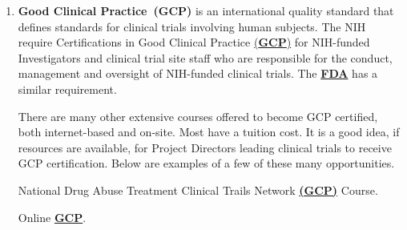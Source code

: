 \documentclass[]{book}
\theoremstyle{definition}
\theoremstyle{definition}
\theoremstyle{definition}
\theoremstyle{remark}
\begin{document}
\begin{enumerate}
\def\labelenumi{\arabic{enumi}.}
\item
  \textbf{Good Clinical Practice~(GCP)} is an international quality
  standard that defines standards for clinical trials involving human
  subjects. The NIH require Certifications in Good Clinical Practice
  \href{https://grants.nih.gov/grants/guide/notice-files/NOT-OD-16-148.html\#_ftn2_}{(\textbf{GCP})}
  for NIH-funded Investigators and clinical trial site staff who are
  responsible for the conduct, management and oversight of NIH-funded
  clinical trials. The
  \href{https://gcplearningcenter.niaid.nih.gov/Pages/default.aspx}{\textbf{FDA}}
  has a similar requirement.

  There are many other extensive courses offered to become GCP
  certified, both internet-based and on-site. Most have a tuition cost.
  It is a good idea, if resources are available, for Project Directors
  leading clinical trials to receive GCP certification. Below are
  examples of a few of these many opportunities.

  National Drug Abuse Treatment Clinical Trails Network
  \href{https://gcp.nihtraining.com/}{\textbf{(GCP)}} Course.

  Online \href{http://www.onlinegcp.us/}{\textbf{GCP}}.


\end{enumerate}
\end{document}

